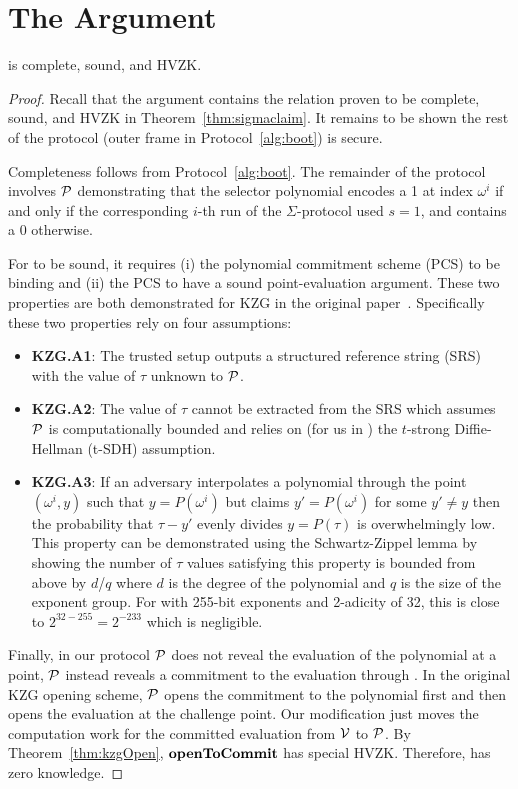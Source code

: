 
\section{The \bootstrap Argument}

\begin{claim}
\label{thm:keys}
\bootstrap is complete, sound, and HVZK.
\end{claim}

\begin{proof}
Recall that the \bootstrap argument contains the relation proven to be complete, sound, and HVZK in Theorem~\ref{thm:sigmaclaim}. It remains to be shown the rest of the protocol (outer frame in Protocol~\ref{alg:boot}) is secure.

Completeness follows from Protocol~\ref{alg:boot}. The remainder of the protocol involves $\mathcal{P}$ demonstrating that the selector polynomial encodes a 1 at index $\omega^i$ if and only if the corresponding $i$-th run of the $\Sigma$-protocol used $s=1$, and contains a 0 otherwise.

For \bootstrap to be sound, it requires (i) the polynomial commitment scheme (PCS) to be binding and (ii) the PCS to have a sound point-evaluation argument. These two properties are both demonstrated for KZG in the original paper~\cite{kzg}. Specifically these two properties rely on four assumptions:
\begin{itemize}
\item \textbf{KZG.A1}: The trusted setup outputs a structured reference string (SRS) with the value of $\tau$ unknown to $\mathcal{P}$. 
\item \textbf{KZG.A2}: The value of $\tau$ cannot be extracted from the SRS which assumes $\mathcal{P}$ is computationally bounded and relies on (for us in \bls) the $t$-strong Diffie-Hellman (t-SDH) assumption.
\item \textbf{KZG.A3}: If an adversary interpolates a polynomial through the point $(\omega^i,y)$ such that $y=P(\omega^i)$ but claims $y'=P(\omega^i)$ for some $y'\neq y$ then the probability that $\tau-y'$ evenly divides $y=P(\tau)$ is overwhelmingly low. This property can be demonstrated using the Schwartz-Zippel lemma by showing the number of $\tau$ values satisfying this property is bounded from above by $d$/$q$ where $d$ is the degree of the polynomial and $q$ is the size of the exponent group. For \bls with 255-bit exponents and 2-adicity of 32, this is close to $2^{32-255}=2^{-233}$ which is negligible.
\end{itemize}

Finally, in our protocol $\mathcal{P}$ does not reveal the evaluation of the polynomial at a point, $\mathcal{P}$ instead reveals a commitment to the evaluation through \openc. In the original KZG opening scheme, $\mathcal{P}$ opens the commitment to the polynomial first and then opens the evaluation at the challenge point. Our modification just moves the computation work for the committed evaluation from $\mathcal{V}$ to $\mathcal{P}$. By Theorem~\ref{thm:kzgOpen}, $\textbf{openToCommit}$ has special HVZK. Therefore, \bootstrap has zero knowledge.
\end{proof}

